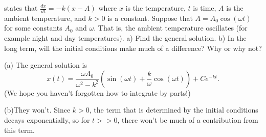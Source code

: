 { states that $\frac{dx}{dt} = -k(x-A)$ where
$x$ is the temperature, $t$ is time, $A$ is the ambient temperature,
and $k > 0$ is a constant.
Suppose that $A = A_0 \cos (\omega t)$ for some constants $A_0$ and $\omega$.
That is, the ambient temperature oscillates (for example night and day
temperatures).  a) Find the general solution.  b) In the long term, will the
initial conditions make much of a difference?  Why or why not?}
{(a) The general solution is
\[
x(t) = \frac{\omega A_0}{\omega^2-k^2}\left(\sin (\omega t)+\frac{k}{\omega}\cos(\omega t)\right)+Ce^{-kt}.
\]
(We hope you haven't forgotten how to integrate by parts!)

(b)They won't. Since $k>0$, the term that is determined by the initial conditions decays exponentially, so for $t>>0$, there won't be much of a contribution from this term.}